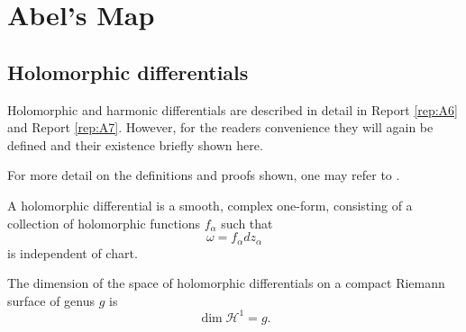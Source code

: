 \section{Abel's Map}\label{secB12:Abel}

\subsection{Holomorphic differentials}
Holomorphic and harmonic differentials are described in detail in Report \ref{rep:A6} and Report \ref{rep:A7}. However, for the readers convenience they will again be defined and their existence briefly shown here.

For more detail on the definitions and proofs shown, one may refer to \cite{Ber06}.

\begin{definition}
    A holomorphic differential is a smooth, complex one-form, consisting of a collection of holomorphic functions $f_\alpha$ such that
    \begin{equation}
        \omega = f_\alpha dz_\alpha
    \end{equation}
    is independent of chart.
\end{definition}

\begin{theorem}
    The dimension of the space of holomorphic differentials on a compact Riemann surface of genus $g$ is
    \begin{equation}
        \dim \mathcal H^1 = g.
    \end{equation}
\end{theorem}

